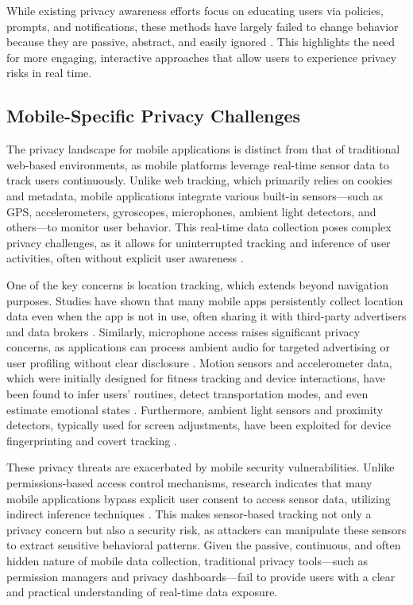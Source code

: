 \documentclass[acmlarge, nonacm]{acmart}
\begin{document}
While existing privacy awareness efforts focus on educating users via policies, prompts, and notifications, these methods have largely failed to change behavior because they are passive, abstract, and easily ignored \cite{feng2021yaodesign}. This highlights the need for more engaging, interactive approaches that allow users to experience privacy risks in real time.

\subsection{Mobile-Specific Privacy Challenges}
The privacy landscape for mobile applications is distinct from that of traditional web-based environments, as mobile platforms leverage real-time sensor data to track users continuously. Unlike web tracking, which primarily relies on cookies and metadata, mobile applications integrate various built-in sensors—such as GPS, accelerometers, gyroscopes, microphones, ambient light detectors, and others—to monitor user behavior. This real-time data collection poses complex privacy challenges, as it allows for uninterrupted tracking and inference of user activities, often without explicit user awareness \cite{CAHAR}.

One of the key concerns is location tracking, which extends beyond navigation purposes. Studies have shown that many mobile apps persistently collect location data even when the app is not in use, often sharing it with third-party advertisers and data brokers \cite{bian2021supply}. Similarly, microphone access raises significant privacy concerns, as applications can process ambient audio for targeted advertising or user profiling without clear disclosure \cite{pudasaini2024comprehensive}. Motion sensors and accelerometer data, which were initially designed for fitness tracking and device interactions, have been found to infer users’ routines, detect transportation modes, and even estimate emotional states \cite{niemeijer2023promise}. Furthermore, ambient light sensors and proximity detectors, typically used for screen adjustments, have been exploited for device fingerprinting and covert tracking \cite{berdich2023survey}.

These privacy threats are exacerbated by mobile security vulnerabilities. Unlike permissions-based access control mechanisms, research indicates that many mobile applications bypass explicit user consent to access sensor data, utilizing indirect inference techniques \cite{aburas2024user}. This makes sensor-based tracking not only a privacy concern but also a security risk, as attackers can manipulate these sensors to extract sensitive behavioral patterns. Given the passive, continuous, and often hidden nature of mobile data collection, traditional privacy tools—such as permission managers and privacy dashboards—fail to provide users with a clear and practical understanding of real-time data exposure.
\end{document}
